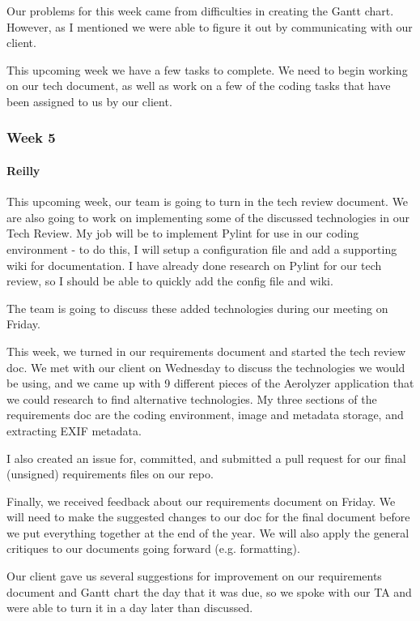 \documentclass[onecolumn, draftclsnofoot,10pt, compsoc]{IEEEtran}
\begin{document}
\begin{flushleft}
 
Our problems for this week came from difficulties in creating the Gantt chart. However, as I mentioned we were able to figure it out by communicating with our client.
 
 
This upcoming week we have a few tasks to complete. We need to begin working on our tech document, as well as work on a few of the coding tasks that have been assigned to us by our client.
 
\subsubsection{Week 5}
\paragraph{Reilly}
 
This upcoming week, our team is going to turn in the tech review document. We are also going to work on implementing some of the discussed technologies in our Tech Review. My job will be to implement Pylint for use in our coding environment - to do this, I will setup a configuration file and add a supporting wiki for documentation. I have already done research on Pylint for our tech review, so I should be able to quickly add the config file and wiki.
 
The team is going to discuss these added technologies during our meeting on Friday.
 
 
This week, we turned in our requirements document and started the tech review doc. We met with our client on Wednesday to discuss the technologies we would be using, and we came up with 9 different pieces of the Aerolyzer application that we could research to find alternative technologies. My three sections of the requirements doc are the coding environment, image and metadata storage, and extracting EXIF metadata.
 
I also created an issue for, committed, and submitted a pull request for our final (unsigned) requirements files on our repo.
 
Finally, we received feedback about our requirements document on Friday. We will need to make the suggested changes to our doc for the final document before we put everything together at the end of the year. We will also apply the general critiques to our documents going forward (e.g. formatting).
 
 
Our client gave us several suggestions for improvement on our requirements document and Gantt chart the day that it was due, so we spoke with our TA and were able to turn it in a day later than discussed.
 

\end{flushleft}
\end{document}

